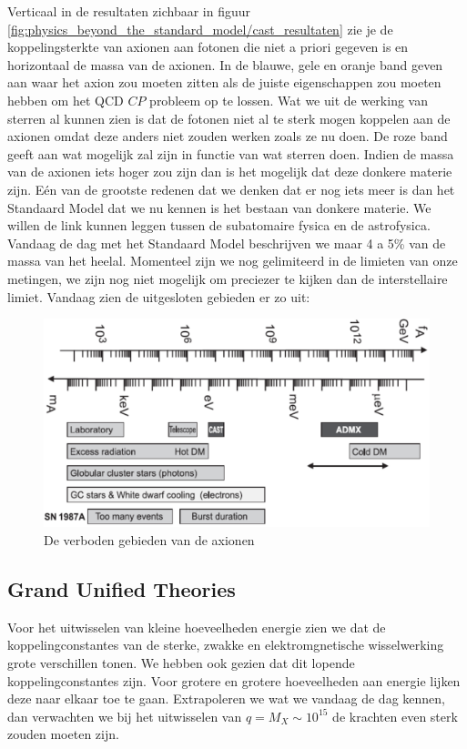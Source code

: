 \documentclass[../main.tex]{subfiles}
\begin{document}
Verticaal in de resultaten zichbaar in figuur \ref{fig:physics_beyond_the_standard_model/cast_resultaten} zie je de koppelingsterkte van axionen aan fotonen die niet a priori gegeven is en horizontaal de massa van de axionen. In de blauwe, gele en oranje band geven aan waar het axion zou moeten zitten als de juiste eigenschappen zou moeten hebben om het QCD $CP$ probleem op te lossen. Wat we uit de werking van sterren al kunnen zien is dat de fotonen niet al te sterk mogen koppelen aan de axionen omdat deze anders niet zouden werken zoals ze nu doen. De roze band geeft aan wat mogelijk zal zijn in functie van wat sterren doen. Indien de massa van de axionen iets hoger zou zijn dan is het mogelijk dat deze donkere materie zijn. Eén van de grootste redenen dat we denken dat er nog iets meer is dan het Standaard Model dat we nu kennen is het bestaan van donkere materie. We willen de link kunnen leggen tussen de subatomaire fysica en de astrofysica. Vandaag de dag met het Standaard Model beschrijven we maar 4 a 5\% van de massa van het heelal. Momenteel zijn we nog gelimiteerd in de limieten van onze metingen, we zijn nog niet mogelijk om preciezer te kijken dan de interstellaire limiet. Vandaag zien de uitgesloten gebieden er zo uit:

\begin{figure}[h]
    \centering
    \includegraphics[width=0.6\linewidth]{physics_beyond_the_standard_model/axionen_verboden_gebieden.png}
    \caption{De verboden gebieden van de axionen}%
    \label{fig:physics_beyond_the_standard_model/axionen_verboden_gebieden}
\end{figure}

\subsection{Grand Unified Theories}%
\label{sub:grand_unified_theories}

Voor het uitwisselen van kleine hoeveelheden energie zien we dat de koppelingconstantes van de sterke, zwakke en elektromgnetische wisselwerking grote verschillen tonen. We hebben ook gezien dat dit lopende koppelingconstantes zijn. Voor grotere en grotere hoeveelheden aan energie lijken deze naar elkaar toe te gaan. Extrapoleren we wat we vandaag de dag kennen, dan verwachten we bij het uitwisselen van $q=M_{X} \sim 10^{15}$ de krachten even sterk zouden moeten zijn.
\end{document}
